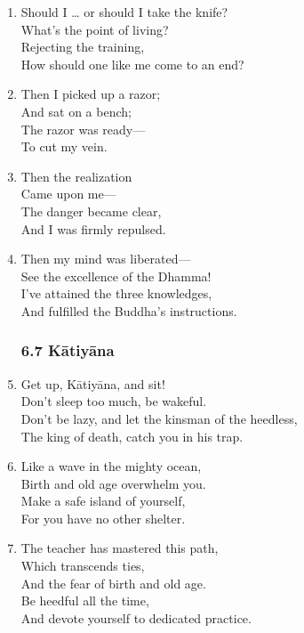 \documentclass[10pt, openany]{book}
\begin{document}
\begin{enumerate}
\item Should I … or should I take the knife?\\
What’s the point of living?\\
Rejecting the training,\\
How should one like me come to an end?

\item Then I picked up a razor;\\
And sat on a bench;\\
The razor was ready—\\
To cut my vein.

\item Then the realization\\
Came upon me—\\
The danger became clear,\\
And I was firmly repulsed.

\item Then my mind was liberated—\\
See the excellence of the Dhamma!\\
I’ve attained the three knowledges,\\
And fulfilled the Buddha’s instructions.

\subsubsection*{6.7 Kātiyāna}

\item Get up, Kātiyāna, and sit!\\
Don’t sleep too much, be wakeful.\\
Don’t be lazy, and let the kinsman of the heedless,\\
The king of death, catch you in his trap.

\item Like a wave in the mighty ocean,\\
Birth and old age overwhelm you.\\
Make a safe island of yourself,\\
For you have no other shelter.

\item The teacher has mastered this path,\\
Which transcends ties, \\
And the fear of birth and old age.\\
Be heedful all the time,\\
And devote yourself to dedicated practice.


\end{enumerate}
\end{document}
